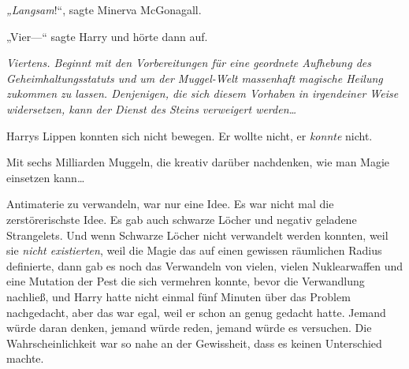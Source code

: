 \emph{„Langsam}!“, sagte Minerva McGonagall.

„Vier—“ sagte Harry und hörte dann auf.

\emph{Viertens. Beginnt mit den Vorbereitungen für eine geordnete Aufhebung des Geheimhaltungsstatuts und um der Muggel-Welt massenhaft magische Heilung zukommen zu lassen. Denjenigen, die sich diesem Vorhaben in irgendeiner Weise widersetzen, kann der Dienst des Steins verweigert werden…}

Harrys Lippen konnten sich nicht bewegen. Er wollte nicht, er \emph{konnte} nicht.

Mit sechs Milliarden Muggeln, die kreativ darüber nachdenken, wie man Magie einsetzen kann…

Antimaterie zu verwandeln, war nur eine Idee. Es war nicht mal die zerstörerischste Idee. Es gab auch schwarze Löcher und negativ geladene Strangelets.
Und wenn Schwarze Löcher nicht verwandelt werden konnten, weil sie \emph{nicht existierten}, weil die Magie das auf einen gewissen räumlichen Radius definierte, dann gab es noch das Verwandeln von vielen, vielen Nuklearwaffen und eine Mutation der Pest die sich vermehren konnte, bevor die Verwandlung nachließ, und Harry hatte nicht einmal fünf Minuten über das Problem nachgedacht, aber das war egal, weil er schon an genug gedacht hatte.
Jemand würde daran denken, jemand würde reden, jemand würde es versuchen. Die Wahrscheinlichkeit war so nahe an der Gewissheit, dass es keinen Unterschied machte.

